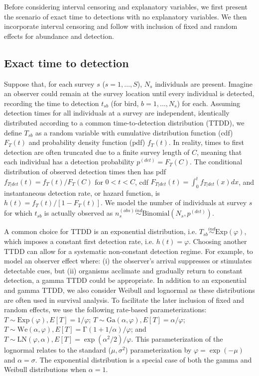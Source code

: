 \documentclass[12pt]{article}
\newcommand{\Exp}{\mbox{Exp}}
\newcommand{\Ga}{\mbox{Ga}}
\newcommand{\We}{\mbox{We}}
\newcommand{\LN}{\mbox{LN}}
\newcommand{\pdet}{p^{(det)}}
\newcommand{\ind}{\stackrel{ind}{\sim}}
\begin{document}
Before considering interval censoring and explanatory variables, we first present the scenario of exact time to detections with no explanatory variables. 
We then incorporate interval censoring and follow with inclusion of fixed and random effects for abundance and detection. 

\subsection{Exact time to detection}

Suppose that, for each survey $s$ ($s=1,\dots,S$), $N_s$ individuals are present.  
Imagine an observer could remain at the survey location until every individual is detected, recording the time to detection $t_{sb}$ (for bird, $b=1,\dots,N_s$) for each.
Assuming detection times for all individuals at a survey are independent, identically distributed according to a common time-to-detection distribution (TTDD), we define $T_{sb}$ as a random variable with cumulative distribution function (cdf) $F_T(t)$ and probability density function (pdf) $f_T(t)$.
In reality, times to first detection are often truncated due to a finite survey length of $C$, meaning that each individual has a detection probability $\pdet=F_T(C)$.  
The conditional distribution of observed detection times then has pdf $f_{T|det}(t)= f_T(t)/F_T(C)$ for $0<t<C$, cdf $F_{T|det}(t) = \int_0^t f_{T|det}(x) dx$, and instantaneous detection rate, or hazard function, is $h(t) = f_T(t) / [1-F_T(t)]$. 
We model the number of individuals at survey $s$ for which $t_{sb}$ is actually observed as $n_{s}^{(obs)} \ind \mbox{Binomial}\left(N_{s}, \pdet\right)$. 

A common choice for TTDD is an exponential distribution, i.e. $T_{sb}\ind \mbox{Exp}(\varphi)$, which imposes a constant first detection rate, i.e. $h(t) = \varphi$.
Choosing another TTDD can allow for a systematic non-constant detection regime. 
For example, to model an observer effect where: (i) the observer's arrival suppresses or stimulates detectable cues, but (ii) organisms acclimate and gradually return to constant detection, a gamma TTDD could be appropriate.
In addition to an exponential and gamma TTDD, we also consider Weibull and lognormal as these distributions are often used in survival analysis. 
To facilitate the later inclusion of fixed and random effects, we use the following rate-based parameterizations: $T\sim \Exp(\varphi), E[T]=1/\varphi$; $T\sim \Ga(\alpha,\varphi), E[T] = \alpha/\varphi$; $T\sim \We(\alpha,\varphi), E[T]=\mathrm{\Gamma}(1+1/\alpha)/\varphi$; and $T\sim \LN(\varphi,\alpha), E[T] = \exp(\alpha^2/2)/\varphi$.  
This parameterization of the lognormal relates to the standard ($\mu, \sigma^2$) parameterization by $\varphi = \exp(-\mu)$ and $\alpha = \sigma$.  %
The exponential distribution is a special case of both the gamma and Weibull distributions when $\alpha=1$. 
\end{document}
